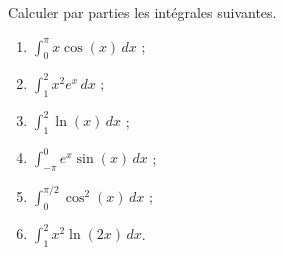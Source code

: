 
\begin{exercice}\label{exoTD5-00003}

Calculer par parties les intégrales suivantes.
\begin{multicols}{3}
  \begin{enumerate}
  \item $\displaystyle \int_0^\pi x\cos(x)\, dx $ ;
  \item $\displaystyle \int_1^2 x^{2}e^x \, dx $ ;
  \item $\displaystyle \int_1^2 \ln(x) \, dx $ ;
  \item $\displaystyle \int_{-\pi}^{0} e^x\sin(x) \, dx $ ;
  \item $\displaystyle \int_{0}^{\pi/2} \cos^2(x) \, dx$ ;
  \item $\displaystyle \int_{1}^{2} x^2\ln(2x) \, dx$.
  \end{enumerate}
\end{multicols}

\end{exercice}
